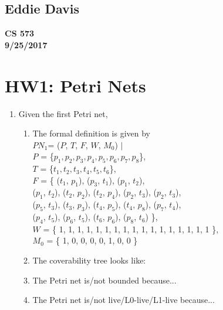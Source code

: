 \documentclass{bsu-ms}
\begin{document}
\subsection*{Eddie Davis}
\textbf{CS 573}\\
\textbf{9/25/2017}\\

\section*{HW1: Petri Nets}

\begin{enumerate}
	\item Given the first Petri net,
	\begin{enumerate}[label=(\alph*)]
		\item The formal definition is given by \\
		$PN_1$= ($P$, $T$, $F$, $W$, $M_0$) $\mid$ \\
		$P$ = \{$p_1, p_2, p_3, p_4, p_5, p_6, p_7, p_8$\}, \\
		$T$ = \{$t_1, t_2, t_3, t_4, t_5, t_6$\}, \\
		$F$ = \{ ($t_1$, $p_1$), ($p_3$, $t_1$), ($p_1$, $t_2$), \\
		($p_1$, $t_2$), ($t_2$, $p_2$), ($t_2$, $p_4$),
		($p_2$, $t_3$), ($p_2$, $t_3$), \\
		($p_5$, $t_3$), ($t_3$, $p_3$), ($t_4$, $p_5$),
		($t_4$, $p_8$), ($p_7$, $t_4$), \\ ($p_4$, $t_5$),
		($p_6$, $t_5$), ($t_6$, $p_6$), ($p_8$, $t_6$)
		 \}, \\
   	    $W$ = \{ 1, 1, 1, 1, 1, 1, 1, 1, 1, 1, 1, 1, 1, 1, 1, 1, 1 \}, \\
        $M_0$ = \{ 1, 0, 0, 0, 0, 1, 0, 0 \}

		\item The coverability tree looks like:				
		\item The Petri net is/not bounded because...
		\item The Petri net is/not live/L0-live/L1-live because...
	\end{enumerate}
	

\end{enumerate}
\end{document}
